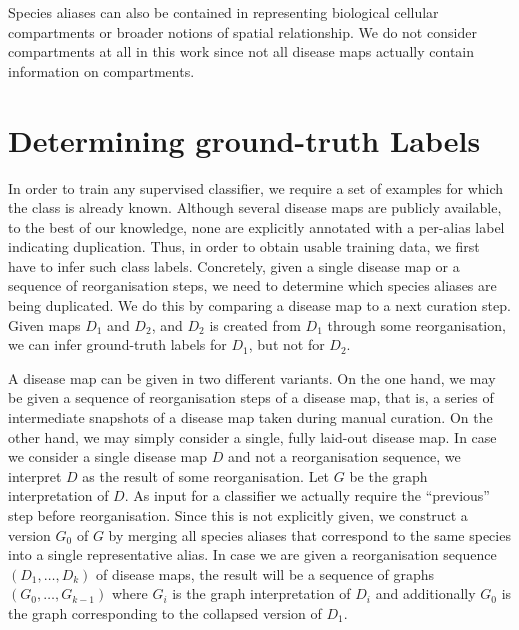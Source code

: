 \documentclass[
	fontsize=10pt, %
	twoside=true, %
	secnumdepth=1, %
  toc=indentunnumbered %
]{kaobook}
\begin{document}
Species aliases can also be contained in  representing
biological cellular compartments or broader notions of spatial relationship. We
do not consider compartments at all in this work since not all disease maps
actually contain information on compartments.





\section{Determining ground-truth Labels}
\label{sec:determining-labels}

In order to train any supervised classifier, we require a set of examples for
which the class is already known. Although several disease maps are publicly
available, to the best of our knowledge, none are explicitly annotated with a
per-alias label indicating duplication. Thus, in order to obtain usable training
data, we first have to infer such class labels. Concretely, given a single
disease map or a sequence of reorganisation steps, we need to determine which
species aliases are being duplicated. We do this by comparing a disease map to
a next curation step. Given maps $D_1$ and $D_2$, and $D_2$ is
created from $D_1$ through some reorganisation, we can infer ground-truth
labels for $D_1$, but not for $D_2$. 

A disease map can be given in two different variants. On the one hand, we may be
given a sequence of reorganisation steps of a disease map, that is, a series of
intermediate snapshots of a disease map taken during manual curation. On the
other hand, we may simply consider a single, fully laid-out disease map.
%
In case we consider a single disease map $D$ and not a reorganisation sequence,
we interpret $D$ as the result of some reorganisation. Let $G$ be the graph
interpretation of $D$. As input for a classifier we actually require the
``previous'' step before reorganisation. Since this is not explicitly given, we
construct a  version $G_0$ of $G$ by merging all species aliases
that correspond to the same species into a single representative alias.
%
In case we are given a reorganisation sequence $(D_1, \ldots, D_k)$ of disease
maps, the result will be a sequence of graphs $(G_0, \ldots, G_{k-1})$ where $G_i$
is the graph interpretation of $D_i$ and additionally $G_0$ is the graph
corresponding to the collapsed version of $D_1$. 
\end{document}
